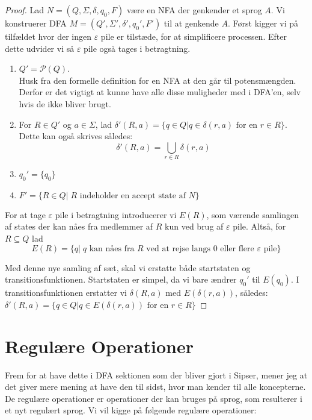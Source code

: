 \begin{proof}
  Lad $N = (Q, \Sigma, \delta, q_{0}, F)$ være en NFA der genkender et sprog $A$. Vi konstruerer DFA $M = (Q', \Sigma', \delta', q_{0}', F')$ til at genkende $A$. Først kigger vi på tilfældet hvor der ingen $\varepsilon$ pile er tilstæde, for at simplificere processen. Efter dette udvider vi så $\varepsilon$ pile også tages i betragtning.
  \begin{enumerate}
    \item $Q' = \mathcal{P}(Q)$. \\ Husk fra den formelle definition for en NFA at den går til potensmængden. Derfor er det vigtigt at kunne have alle disse muligheder med i DFA'en, selv hvis de ikke bliver brugt.
    \item For $R \in Q'$ og $a \in \Sigma$, lad $\delta'(R, a) = \{q \in Q| q \in \delta(r,a) \text{ for en } r \in R\}$.\\ Dette kan også skrives således: \[\delta'(R,a)= \bigcup_{r \in R} \delta(r,a) \]
    \item $q_{0}' = \{q_{0}\}$
          \item $F' = \{R \in Q | \; R \text{ indeholder en accept state af } N\}$
  \end{enumerate}

  For at tage $\varepsilon$ pile i betragtning introducerer vi $E(R)$, som værende samlingen af states der kan nåes fra medlemmer af $R$ kun ved brug af $\varepsilon$ pile. Altså, for $R \subseteq Q$ lad \[E(R) = \{q|\; q\text{ kan nåes fra } R \text{ ved at rejse langs 0 eller flere } \varepsilon \text{ pile}\}\]

Med denne nye samling af sæt, skal vi erstatte både startstaten og transitionsfunktionen. Startstaten er simpel, da vi bare ændrer $q_{0}'$ til $E(q_{0})$. I transitionsfunktionen erstatter vi $\delta(R,a)$ med $E(\delta(r,a))$, således:
  $\delta'(R, a) = \{q \in Q| q \in E(\delta(r,a)) \text{ for en } r \in R\}$
\end{proof}





\newpage
\section{Regulære Operationer}

Frem for at have dette i DFA sektionen som der bliver gjort i Sipser, mener jeg at det giver mere mening at have den til sidst, hvor man kender til alle koncepterne. De regulære operationer er operationer der kan bruges på sprog, som resulterer i et nyt regulært sprog. Vi vil kigge på følgende regulære operationer:

